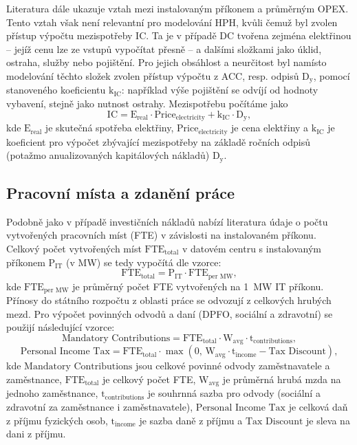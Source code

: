 Literatura dále ukazuje vztah mezi instalovaným příkonem a průměrným OPEX. Tento vztah však není relevantní pro modelování HPH, kvůli čemuž byl zvolen přístup výpočtu mezispotřeby $\text{IC}$. Ta je v případě DC tvořena zejména elektřinou -- jejíž cenu lze ze vstupů vypočítat přesně -- a dalšími složkami jako úklid, ostraha, služby nebo pojištění. Pro jejich obsáhlost a neurčitost byl namísto modelování těchto složek zvolen přístup výpočtu z ACC, resp. odpisů $\text{D}_\text{y}$, pomocí stanoveného koeficientu $\text{k}_\text{IC}$: například výše pojištění se odvíjí od hodnoty vybavení, stejně jako nutnost ostrahy. Mezispotřebu počítáme jako
$$\text{IC} = \text{E}_\text{real} \cdot \text{Price}_\text{electricity}  + \text{k}_\text{IC} \cdot \text{D}_\text{y},$$
kde $\text{E}_\text{real}$ je skutečná spotřeba elektřiny, $\text{Price}_\text{electricity}$ je cena elektřiny a $\text{k}_\text{IC}$ je koeficient pro výpočet zbývající mezispotřeby na základě ročních odpisů (potažmo anualizovaných kapitálových nákladů) $\text{D}_\text{y}$.

\subsection{Pracovní místa a zdanění práce}
\label{subsec:model_prace_dane}

Podobně jako v případě investičních nákladů nabízí literatura údaje o počtu vytvořených pracovních míst (FTE) v závislosti na instalovaném příkonu. Celkový počet vytvořených míst $\text{FTE}_\text{total}$ v datovém centru s instalovaným příkonem $\text{P}_\text{IT}$ (v MW) se tedy vypočítá dle vzorce:
$$\text{FTE}_\text{total} = \text{P}_\text{IT} \cdot \text{FTE}_\text{per MW},$$
kde $\text{FTE}_\text{per MW}$ je průměrný počet FTE vytvořených na 1~MW IT příkonu.
Přínosy do státního rozpočtu z oblasti práce se odvozují z celkových hrubých mezd. Pro výpočet povinných odvodů a daní (DPFO, sociální a zdravotní) se použijí následující vzorce:
$$\text{Mandatory Contributions} = \text{FTE}_\text{total} \cdot \text{W}_\text{avg} \cdot \text{t}_{\text{contributions}},$$
$$\text{Personal Income Tax} = \text{FTE}_\text{total} \cdot \max\left(0,\, \text{W}_\text{avg} \cdot \text{t}_{\text{income}} - \text{Tax Discount}\right),$$
kde $\text{Mandatory Contributions}$ jsou celkové povinné odvody zaměstnavatele a zaměstnance, $\text{FTE}_\text{total}$ je celkový počet FTE, $\text{W}_\text{avg}$ je průměrná hrubá mzda na jednoho zaměstnance, $\text{t}_{\text{contributions}}$ je souhrnná sazba pro odvody (sociální a zdravotní za zaměstnance i zaměstnavatele), $\text{Personal Income Tax}$ je celková daň z příjmu fyzických osob, $\text{t}_{\text{income}}$ je sazba daně z příjmu a $\text{Tax Discount}$ je sleva na dani z příjmu.

